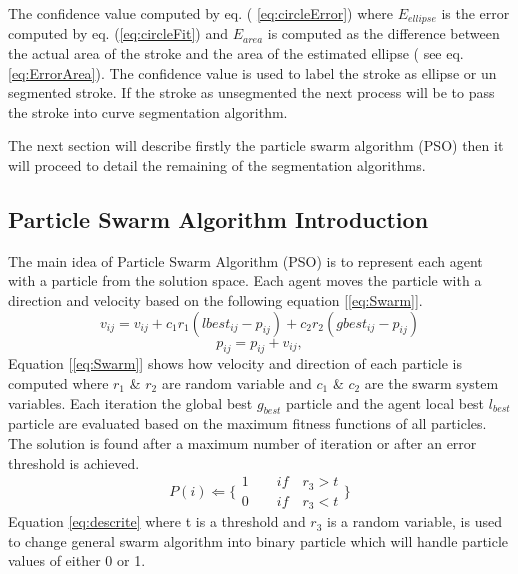    The confidence value computed by eq. ( \ref{eq:circleError}) where $E_{ellipse}$ is the error computed by eq. (\ref{eq:circleFit})  and $E_{area}$ is computed as the difference between the actual area of the stroke and the area of the estimated ellipse ( see eq.\ref{eq:ErrorArea}). The confidence value is used to label the stroke as ellipse or un segmented stroke. If the stroke as unsegmented the next process will be to pass the stroke into curve segmentation algorithm. 
   
   The next section will describe firstly the particle swarm algorithm (PSO) then it will proceed to detail the remaining of the segmentation algorithms. 
   


\subsection{Particle Swarm Algorithm Introduction}
\label{sec:ParticleSwarmAlgorithm}
The main idea of  Particle Swarm Algorithm (PSO) is to represent each agent with a particle from the solution space. Each agent moves the particle with a direction and velocity based on the following equation [\ref{eq:Swarm}].
\begin{equation}
v_{ij}  = v_{ij}  + c_1 r_1 (lbest_{ij}  - p_{ij} ) + c_2 r_2 (gbest_{ij}  - p_{ij} )
\label{eq:Swarm}
\end{equation}
\begin{equation}
p_{ij}=p_{ij}+v_{ij},
\end{equation}
 Equation [\ref{eq:Swarm}] shows how velocity and direction of each particle is computed where $r_1$ \& $r_2$ are random variable and $c_1$ \& $c_2$ are the swarm system variables. Each iteration the global best $g_{best}$ particle and  the agent local best $l_{best}$ particle are evaluated based on the maximum fitness functions of  all particles. The solution is found after a maximum number of iteration or after an error threshold is achieved.
 \begin{equation}
   P(i)\Leftarrow 
\{
\begin{array}{c} 
1 \quad \quad if\quad r_{3}>t  \\

0 \quad \quad if\quad r_{3}<t 
\label{eq:descrite}
\end{array}\}
\end{equation}
  Equation \ref{eq:descrite} where t is a threshold and $r_{3}$  is a random variable, is used to change general swarm algorithm into binary particle which will handle particle values of either 0 or 1.  

